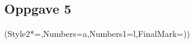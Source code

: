 \subsection*{Oppgave 5}

\begin{easylist}
	\ListProperties(Style2*=,Numbers=a,Numbers1=l,FinalMark={)})
	
	
	
\end{easylist}




